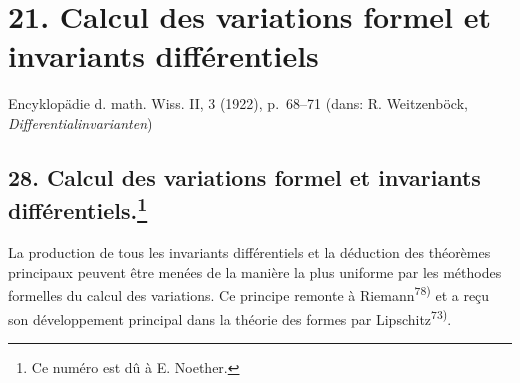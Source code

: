 \documentclass[11pt]{article}
\begin{document}
\fi


\section*{21. Calcul des variations formel et invariants différentiels}
\begin{center}
Encyklopädie d. math. Wiss. II, 3 (1922), p.~68--71 (dans: R. Weitzenböck, \emph{Differentialinvarianten})
\end{center}

\setcounter{footnote}{148}
\subsection*{28. Calcul des variations formel et invariants différentiels.\footnote{Ce numéro est dû à E. Noether.}}

La production de tous les invariants différentiels et la déduction des théorèmes principaux peuvent être menées de la manière la plus uniforme par les méthodes formelles du calcul des variations. Ce principe remonte à Riemann\textsuperscript{78)} et a reçu son développement principal dans la théorie des formes par Lipschitz\textsuperscript{73)}.
\end{document}
